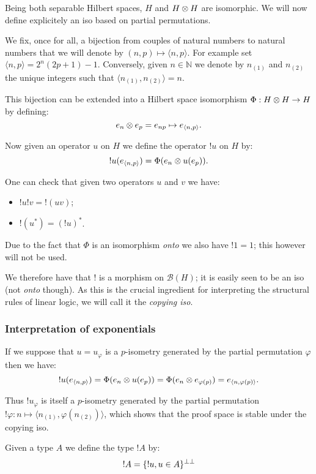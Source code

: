 Being both separable Hilbert spaces, \(H\) and \(H\otimes H\) are
isomorphic. We will now define explicitely an iso based on partial
permutations.

We fix, once for all, a bijection from couples of natural numbers to
natural numbers that we will denote by
\((n,p)\mapsto\langle n,p\rangle\). For example set
\(\langle n,p\rangle = 2^n(2p+1) - 1\). Conversely, given
\(n\in\mathbb{N}\) we denote by \(n_{(1)}\) and \(n_{(2)}\) the unique
integers such that \(\langle n_{(1)},
n_{(2)}\rangle = n\).

This bijection can be extended into a Hilbert space isomorphism
\(\Phi:H\otimes H\rightarrow H\) by defining:
\begin{equation*}
e_n\otimes e_p = e_{np} \mapsto e_{\langle n,p\rangle}.
\end{equation*}

Now given an operator \(u\) on \(H\) we define the operator \(!u\) on
\(H\) by:
\begin{equation*}
!u(e_{\langle n,p\rangle}) = \Phi(e_n\otimes u(e_p)).
\end{equation*}

One can check that given two operators \(u\) and \(v\) we have:
\begin{itemize}
\item \(!u!v = {!(uv)}\);
\item \(!(u^*) = (!u)^*\).
\end{itemize}

Due to the fact that \(\Phi\) is an isomorphism \emph{onto} we also have
\(!1=1\); this however will not be used.

We therefore have that \(!\) is a morphism on \(\mathcal{B}(H)\); it is
easily seen to be an iso (not \emph{onto} though). As this is the
crucial ingredient for interpreting the structural rules of linear
logic, we will call it the \emph{copying iso}.

\subsubsection{Interpretation of
exponentials}\label{interpretation-of-exponentials}

If we suppose that \(u = u_\varphi\) is a \(p\)-isometry generated by
the partial permutation \(\varphi\) then we have:
\begin{equation*}
!u(e_{\langle n,p\rangle}) = \Phi(e_n\otimes u(e_p)) = \Phi(e_n\otimes e_{\varphi(p)}) = e_{\langle n,\varphi(p)\rangle}.
\end{equation*}

Thus \(!u_\varphi\) is itself a \(p\)-isometry generated by the partial
permutation
\(!\varphi:n\mapsto \langle n_{(1)}, \varphi(n_{(2)})\rangle\), which
shows that the proof space is stable under the copying iso.

Given a type \(A\) we define the type \(!A\) by:
\begin{equation*}
!A = \{!u, u\in A\}^{\bot\bot}
\end{equation*}


